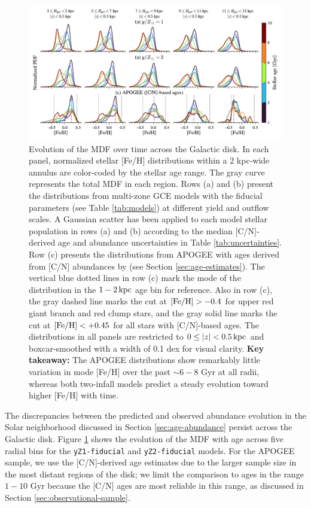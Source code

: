 \documentclass[twocolumn,twocolappendix,linenumbers]{aastex631}
\newcommand{\mathFeH}{{\rm [Fe/H]}}
\newcommand{\kpc}{\,{\rm kpc}}
\begin{document}
\begin{figure}
    \centering
    \includegraphics[width=\textwidth]{figures/mdf_evolution.pdf}
    \caption{Evolution of the MDF over time across the Galactic disk. In each panel, normalized stellar [Fe/H] distributions within a {2 kpc}-wide annulus are color-coded by the stellar age range. The gray curve represents the total MDF in each region. Rows (a) and (b) present the distributions from multi-zone GCE models with the fiducial parameters (see Table \ref{tab:models}) at different yield and outflow scales. A Gaussian scatter has been applied to each model stellar population in rows (a) and (b) according to the median [C/N]-derived age and abundance uncertainties in Table \ref{tab:uncertainties}. Row (c) presents the distributions from APOGEE with ages derived from [C/N] abundances by \citet{roberts_cn_2025} (see Section \ref{sec:age-estimates}). The vertical blue dotted lines in row (c) mark the mode of the distribution in the $1-2\kpc$ age bin for reference. Also in row (c), the gray dashed line marks the cut at $\mathFeH>-0.4$ for upper red giant branch and red clump stars, and the gray solid line marks the cut at $\mathFeH<+0.45$ for all stars with [C/N]-based ages. The distributions in all panels are restricted to $0\leq|z|<0.5\kpc$ and boxcar-smoothed with a width of {0.1 dex} for visual clarity. {\bf Key takeaway:} The APOGEE distributions show remarkably little variation in mode [Fe/H] over the past $\sim6-8$ Gyr at all radii, whereas both two-infall models predict a steady evolution toward higher [Fe/H] with time.}
    \label{fig:mdf-evolution}
\end{figure}

The discrepancies between the predicted and observed abundance evolution in the Solar neighborhood discussed in Section \ref{sec:age-abundance} persist across the Galactic disk. Figure \ref{fig:mdf-evolution} shows the evolution of the MDF with age across five radial bins for the {\tt yZ1-fiducial} and {\tt yZ2-fiducial} models. For the APOGEE sample, we use the [C/N]-derived age estimates due to the larger sample size in the most distant regions of the disk; we limit the comparison to ages in the range $1-10$ Gyr because the [C/N] ages are most reliable in this range, as discussed in Section \ref{sec:observational-sample}. 
\end{document}

